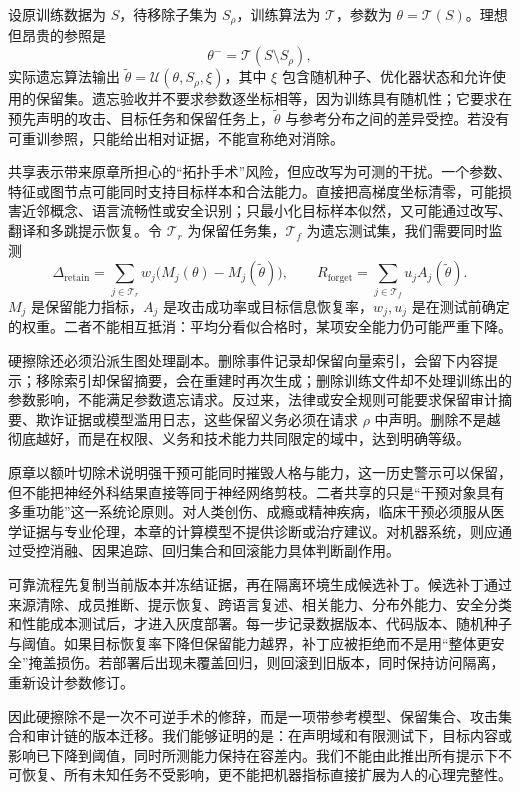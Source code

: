 设原训练数据为 $S$，待移除子集为 $S_\rho$，训练算法为 $\mathcal T$，参数为 $\theta=\mathcal T(S)$。理想但昂贵的参照是
\[
\theta^{-}=\mathcal T(S\setminus S_\rho),
\]
实际遗忘算法输出 $\widetilde\theta=\mathcal U(\theta,S_\rho,\xi)$，其中 $\xi$ 包含随机种子、优化器状态和允许使用的保留集。遗忘验收并不要求参数逐坐标相等，因为训练具有随机性；它要求在预先声明的攻击、目标任务和保留任务上，$\widetilde\theta$ 与参考分布之间的差异受控。若没有可重训参照，只能给出相对证据，不能宣称绝对消除。

共享表示带来原章所担心的“拓扑手术”风险，但应改写为可测的干扰。一个参数、特征或图节点可能同时支持目标样本和合法能力。直接把高梯度坐标清零，可能损害近邻概念、语言流畅性或安全识别；只最小化目标样本似然，又可能通过改写、翻译和多跳提示恢复。令 $\mathcal T_r$ 为保留任务集，$\mathcal T_f$ 为遗忘测试集，我们需要同时监测
\[
\Delta_{\mathrm{retain}}
=\sum_{j\in\mathcal T_r}w_j
\bigl(M_j(\theta)-M_j(\widetilde\theta)\bigr),
\qquad
R_{\mathrm{forget}}
=\sum_{j\in\mathcal T_f}u_j A_j(\widetilde\theta).
\]
$M_j$ 是保留能力指标，$A_j$ 是攻击成功率或目标信息恢复率，$w_j,u_j$ 是在测试前确定的权重。二者不能相互抵消：平均分看似合格时，某项安全能力仍可能严重下降。

硬擦除还必须沿派生图处理副本。删除事件记录却保留向量索引，会留下内容提示；移除索引却保留摘要，会在重建时再次生成；删除训练文件却不处理训练出的参数影响，不能满足参数遗忘请求。反过来，法律或安全规则可能要求保留审计摘要、欺诈证据或模型滥用日志，这些保留义务必须在请求 $\rho$ 中声明。删除不是越彻底越好，而是在权限、义务和技术能力共同限定的域中，达到明确等级。

原章以额叶切除术说明强干预可能同时摧毁人格与能力，这一历史警示可以保留，但不能把神经外科结果直接等同于神经网络剪枝。二者共享的只是“干预对象具有多重功能”这一系统论原则。对人类创伤、成瘾或精神疾病，临床干预必须服从医学证据与专业伦理，本章的计算模型不提供诊断或治疗建议。对机器系统，则应通过受控消融、因果追踪、回归集合和回滚能力具体判断副作用。

可靠流程先复制当前版本并冻结证据，再在隔离环境生成候选补丁。候选补丁通过来源清除、成员推断、提示恢复、跨语言复述、相关能力、分布外能力、安全分类和性能成本测试后，才进入灰度部署。每一步记录数据版本、代码版本、随机种子与阈值。如果目标恢复率下降但保留能力越界，补丁应被拒绝而不是用“整体更安全”掩盖损伤。若部署后出现未覆盖回归，则回滚到旧版本，同时保持访问隔离，重新设计参数修订。

因此硬擦除不是一次不可逆手术的修辞，而是一项带参考模型、保留集合、攻击集合和审计链的版本迁移。我们能够证明的是：在声明域和有限测试下，目标内容或影响已下降到阈值，同时所测能力保持在容差内。我们不能由此推出所有提示下不可恢复、所有未知任务不受影响，更不能把机器指标直接扩展为人的心理完整性。


